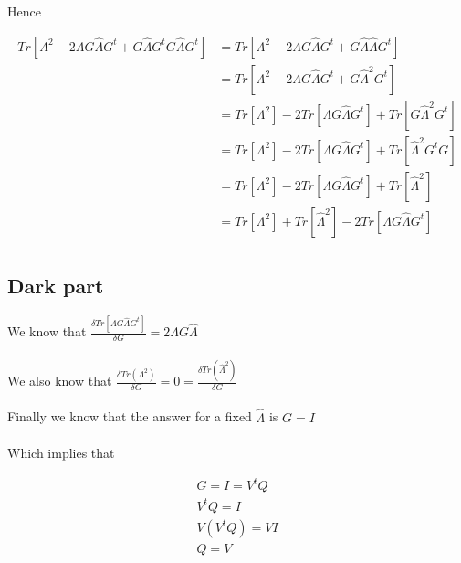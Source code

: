 \documentclass{article}
\begin{document}
    Hence

    \begin{equation*}
        \begin{aligned}
        Tr[\Lambda^2 - 2 \Lambda G \hat{\Lambda} G^t + G \hat{\Lambda} G^t G \hat{\Lambda} G^t]
        &=
        Tr[\Lambda^2 - 2 \Lambda G \hat{\Lambda} G^t + G \hat{\Lambda} \hat{\Lambda} G^t]\\
        &=
        Tr[\Lambda^2 - 2 \Lambda G \hat{\Lambda} G^t + G \hat{\Lambda}^2 G^t]\\
        &=
        Tr[\Lambda^2] - 2 Tr[\Lambda G \hat{\Lambda} G^t] + Tr[G \hat{\Lambda}^2 G^t]\\
        &=
        Tr[\Lambda^2] - 2 Tr[\Lambda G \hat{\Lambda} G^t] + Tr[ \hat{\Lambda}^2 G^tG]\\
        &=
        Tr[\Lambda^2] - 2 Tr[\Lambda G \hat{\Lambda} G^t] + Tr[ \hat{\Lambda}^2]\\
        &=
        Tr[\Lambda^2] + Tr[ \hat{\Lambda}^2] - 2 Tr[\Lambda G \hat{\Lambda} G^t]\\
        \end{aligned}
    \end{equation*}

    \subsection{Dark part}

    We know that $\frac{\delta Tr[\Lambda G \hat{\Lambda} G^t]}{\delta G} = 2\Lambda G \hat{\Lambda}$\\\\
    We also know that $\frac{\delta Tr(\Lambda^2)}{\delta G} = 0 = \frac{\delta Tr(\hat{\Lambda}^2)}{\delta G}$\\\\
    Finally we know that the answer for a fixed $\hat{\Lambda}$ is $G=I$\\ \\

    Which implies that

    \begin{equation*}
        \begin{aligned}
        G = I = V^tQ\\
        V^tQ = I\\
        V(V^tQ) = VI\\
        Q = V
        \end{aligned}
    \end{equation*}
\end{document}
